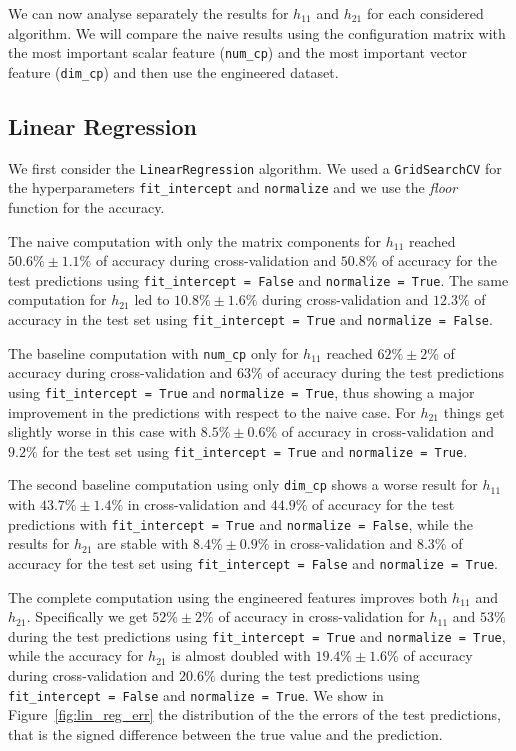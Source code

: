 We can now analyse separately the results for $h_{11}$ and $h_{21}$ for each considered algorithm. We will compare the naive results using the configuration matrix with the most important scalar feature (\texttt{num\_cp}) and the most important vector feature (\texttt{dim\_cp}) and then use the engineered dataset.

\subsection{Linear Regression}
    We first consider the \texttt{LinearRegression} algorithm. We used a \texttt{GridSearchCV} for the hyperparameters \texttt{fit\_intercept} and \texttt{normalize} and we use the \textit{floor} function for the accuracy.
    
    The naive computation with only the matrix components for $h_{11}$ reached $50.6\% \pm 1.1\%$ of accuracy during cross-validation and $50.8\%$ of accuracy for the test predictions using \texttt{fit\_intercept = False} and \texttt{normalize = True}. The same computation for $h_{21}$ led to $10.8\% \pm 1.6\%$ during cross-validation and $12.3\%$ of accuracy in the test set using \texttt{fit\_intercept = True} and \texttt{normalize = False}.
    
    The baseline computation with \texttt{num\_cp} only for $h_{11}$ reached $62\% \pm 2\%$ of accuracy during cross-validation and $63\%$ of accuracy during the test predictions using \texttt{fit\_intercept = True} and \texttt{normalize = True}, thus showing a major improvement in the predictions with respect to the naive case. For $h_{21}$ things get slightly worse in this case with $8.5\% \pm 0.6\%$ of accuracy in cross-validation and $9.2\%$ for the test set using \texttt{fit\_intercept = True} and \texttt{normalize = True}.
    
    The second baseline computation using only \texttt{dim\_cp} shows a worse result for $h_{11}$ with $43.7\% \pm 1.4\%$ in cross-validation and $44.9\%$ of accuracy for the test predictions with \texttt{fit\_intercept = True} and \texttt{normalize = False}, while the results for $h_{21}$ are stable with $8.4\% \pm 0.9\%$ in cross-validation and $8.3\%$ of accuracy for the test set using \texttt{fit\_intercept = False} and \texttt{normalize = True}.
    
    The complete computation using the engineered features improves both $h_{11}$ and $h_{21}$. Specifically we get $52\% \pm 2\%$ of accuracy in cross-validation for $h_{11}$ and $53\%$ during the test predictions using \texttt{fit\_intercept = True} and \texttt{normalize = True}, while the accuracy for $h_{21}$ is almost doubled with $19.4\% \pm 1.6\%$ of accuracy during cross-validation and $20.6\%$ during the test predictions using \texttt{fit\_intercept = False} and \texttt{normalize = True}. We show in Figure~\ref{fig:lin_reg_err} the distribution of the the errors of the test predictions, that is the signed difference between the true value and the prediction.
    

